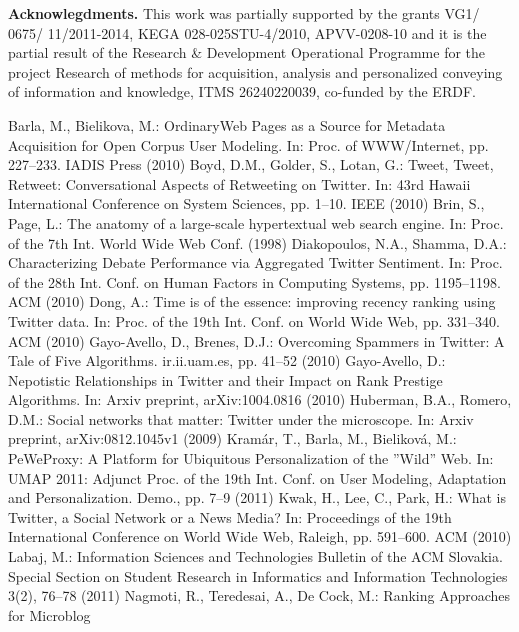 \documentclass[]{article}
\begin{document}
\textbf{Acknowlegdments.} This work was partially supported by the grants VG1/
0675/ 11/2011-2014, KEGA 028-025STU-4/2010, APVV-0208-10 and it is the
partial result of the Research \& Development Operational Programme for the
project Research of methods for acquisition, analysis and personalized conveying
of information and knowledge, ITMS 26240220039, co-funded by the ERDF.

\begin{thebibliography}{9}

  Barla, M., Bielikova, M.: OrdinaryWeb Pages as a Source for Metadata Acquisition
for Open Corpus User Modeling. In: Proc. of WWW/Internet, pp. 227–233. IADIS
Press (2010)
Boyd, D.M., Golder, S., Lotan, G.: Tweet, Tweet, Retweet: Conversational Aspects
of Retweeting on Twitter. In: 43rd Hawaii International Conference on System
Sciences, pp. 1–10. IEEE (2010)
Brin, S., Page, L.: The anatomy of a large-scale hypertextual web search engine.
In: Proc. of the 7th Int. World Wide Web Conf. (1998)
Diakopoulos, N.A., Shamma, D.A.: Characterizing Debate Performance via
Aggregated Twitter Sentiment. In: Proc. of the 28th Int. Conf. on Human Factors
in Computing Systems, pp. 1195–1198. ACM (2010)
Dong, A.: Time is of the essence: improving recency ranking using Twitter data.
In: Proc. of the 19th Int. Conf. on World Wide Web, pp. 331–340. ACM (2010)
Gayo-Avello, D., Brenes, D.J.: Overcoming Spammers in Twitter: A Tale of Five
Algorithms. ir.ii.uam.es, pp. 41–52 (2010)
Gayo-Avello, D.: Nepotistic Relationships in Twitter and their Impact on Rank
Prestige Algorithms. In: Arxiv preprint, arXiv:1004.0816 (2010)
Huberman, B.A., Romero, D.M.: Social networks that matter: Twitter under the
microscope. In: Arxiv preprint, arXiv:0812.1045v1 (2009)
Kramár, T., Barla, M., Bieliková, M.: PeWeProxy: A Platform for Ubiquitous
Personalization of the ”Wild” Web. In: UMAP 2011: Adjunct Proc. of the 19th
Int. Conf. on User Modeling, Adaptation and Personalization. Demo., pp. 7–9
(2011)
Kwak, H., Lee, C., Park, H.: What is Twitter, a Social Network or a News Media?
In: Proceedings of the 19th International Conference on World Wide Web, Raleigh,
pp. 591–600. ACM (2010)
Labaj, M.: Information Sciences and Technologies Bulletin of the ACM Slovakia.
Special Section on Student Research in Informatics and Information Technologies
3(2), 76–78 (2011)
Nagmoti, R., Teredesai, A., De Cock, M.: Ranking Approaches for Microblog

\end{thebibliography}
\end{document}
